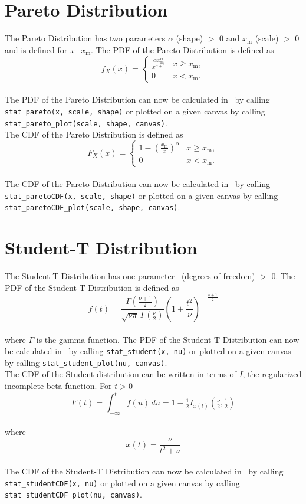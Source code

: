 	\section{Pareto Distribution}
	
		The Pareto Distribution has two parameters $\alpha$ (shape) $>$ 0 and $x_\mathrm{m}$ (scale) $>$ 0 and is defined for \textit{x} \geq\ $x_\mathrm{m}$. The \ac{PDF} of the Pareto Distribution is defined as
		\\[0.3cm]
		$$f_X(x)= \begin{cases} \frac{\alpha x_\mathrm{m}^\alpha}{x^{\alpha+1}} & x \ge x_\mathrm{m}, \\ 0 & x < x_\mathrm{m}. \end{cases}$$
		\\[0.3cm]
		The \ac{PDF} of the Pareto Distribution can now be calculated in \setlx\ by calling \lstinline{stat_pareto(x, scale, shape)} or plotted on a given canvas by calling \lstinline{stat_pareto_plot(scale, shape, canvas)}.
		\\[0.3cm]
		The \ac{CDF} of the Pareto Distribution is defined as
		\\[0.3cm]
		$$F_X(x) = \begin{cases}1-\left(\frac{x_\mathrm{m}}{x}\right)^\alpha & x \ge x_\mathrm{m}, \\0 & x < x_\mathrm{m}.\end{cases}$$
		\\[0.3cm]
		The \ac{CDF} of the Pareto Distribution can now be calculated in \setlx\ by calling \lstinline{stat_paretoCDF(x, scale, shape)} or plotted on a given canvas by calling \lstinline{stat_paretoCDF_plot(scale, shape, canvas)}.
		
	\section{Student-T Distribution}
	
		The Student-T Distribution has one parameter \nu\ (degrees of freedom) $>$ 0. The \ac{PDF} of the Student-T Distribution is defined as
		\\[0.3cm]
		$$f(t) = \frac{\Gamma(\frac{\nu+1}{2})} {\sqrt{\nu\pi}\,\Gamma(\frac{\nu}{2})} \left(1+\frac{t^2}{\nu} \right)^{\!-\frac{\nu+1}{2}}$$
		\\[0.3cm]
		where $\Gamma$ is the gamma function. The \ac{PDF} of the Student-T Distribution can now be calculated in \setlx\ by calling \lstinline{stat_student(x, nu)} or plotted on a given canvas by calling \lstinline{stat_student_plot(nu, canvas)}.
		\\[0.3cm]
		The \ac{CDF} of the Student distribution can be written in terms of $I$, the regularized incomplete beta function. For $t > 0$
		\\[0.3cm]
		$$F(t) = \int_{-\infty}^t f(u)\,du = 1 - \tfrac{1}{2} I_{x(t)}\left(\tfrac{\nu}{2}, \tfrac{1}{2}\right)$$
		\\[0.3cm]
		where $$x(t) = \frac{\nu}{{t^2+\nu}}$$
		\\[0.3cm]
		The \ac{CDF} of the Student-T Distribution can now be calculated in \setlx\ by calling \lstinline{stat_studentCDF(x, nu)} or plotted on a given canvas by calling \lstinline{stat_studentCDF_plot(nu, canvas)}.
		
